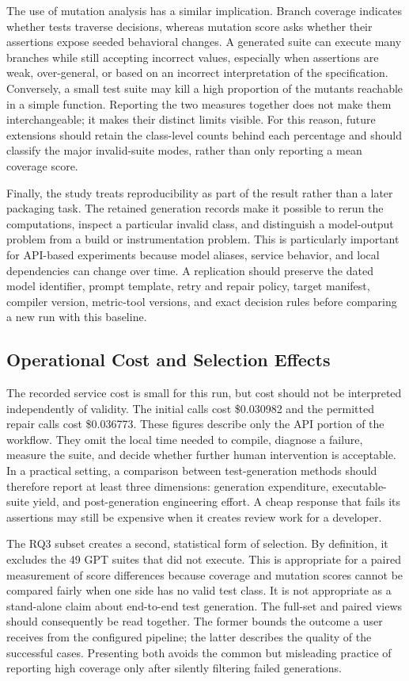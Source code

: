 The use of mutation analysis has a similar implication. Branch coverage indicates whether tests traverse decisions, whereas mutation score asks whether their assertions expose seeded behavioral changes. A generated suite can execute many branches while still accepting incorrect values, especially when assertions are weak, over-general, or based on an incorrect interpretation of the specification. Conversely, a small test suite may kill a high proportion of the mutants reachable in a simple function. Reporting the two measures together does not make them interchangeable; it makes their distinct limits visible. For this reason, future extensions should retain the class-level counts behind each percentage and should classify the major invalid-suite modes, rather than only reporting a mean coverage score.

Finally, the study treats reproducibility as part of the result rather than a later packaging task. The retained generation records make it possible to rerun the computations, inspect a particular invalid class, and distinguish a model-output problem from a build or instrumentation problem. This is particularly important for API-based experiments because model aliases, service behavior, and local dependencies can change over time. A replication should preserve the dated model identifier, prompt template, retry and repair policy, target manifest, compiler version, metric-tool versions, and exact decision rules before comparing a new run with this baseline.

\balance
\subsection{Operational Cost and Selection Effects}
The recorded service cost is small for this run, but cost should not be interpreted independently of validity. The initial calls cost \$0.030982 and the permitted repair calls cost \$0.036773. These figures describe only the API portion of the workflow. They omit the local time needed to compile, diagnose a failure, measure the suite, and decide whether further human intervention is acceptable. In a practical setting, a comparison between test-generation methods should therefore report at least three dimensions: generation expenditure, executable-suite yield, and post-generation engineering effort. A cheap response that fails its assertions may still be expensive when it creates review work for a developer.

The RQ3 subset creates a second, statistical form of selection. By definition, it excludes the 49 GPT suites that did not execute. This is appropriate for a paired measurement of score differences because coverage and mutation scores cannot be compared fairly when one side has no valid test class. It is not appropriate as a stand-alone claim about end-to-end test generation. The full-set and paired views should consequently be read together. The former bounds the outcome a user receives from the configured pipeline; the latter describes the quality of the successful cases. Presenting both avoids the common but misleading practice of reporting high coverage only after silently filtering failed generations.

